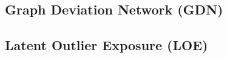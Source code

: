 \documentclass[../../main/main.tex]{subfiles}
\begin{document}
    
    \subsection{Graph Deviation Network (GDN)}
            

    \subsection{Latent Outlier Exposure (LOE)}\label{sect:contamination}
\end{document}
